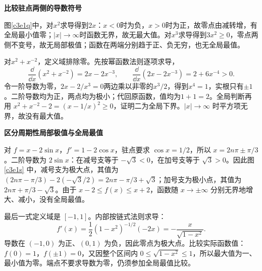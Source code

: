 \begin{solution}\textbf{比较驻点两侧的导数符号}\par\nobreak
图\ref{c3e1q}中，对$x^2$求导得到$2x$：$x<0$时为负，$x>0$时为正，故零点由减转增，有全局最小值零；$|x|\to\infty$时函数无界，故无最大值。对$x^3$求导得到$3x^2\ge0$，零点两侧不变号，故无局部极值；函数在两端分别趋于正、负无穷，也无全局最值。

对$x^2+x^{-2}$，定义域排除零。先按幂函数法则逐项求导，
\[
\frac{\dd}{\dd x}(x^2+x^{-2})=2x-2x^{-3},\qquad
\frac{\dd}{\dd x}(2x-2x^{-3})=2+6x^{-4}>0.
\]
令一阶导数为零，$2x-2/x^3=0$两边乘以非零的$x^3/2$，得到$x^4=1$，实根只有$\pm1$。二阶导数均为正，两点均为极小；代回原函数，值均为$1+1=2$。全局判断再用
$x^2+x^{-2}-2=(x-1/x)^2\ge0$，证明二为全局下界。$|x|\to\infty$ 时平方项无界，故没有最大值。



\par\medskip{}\noindent\textbf{区分周期性局部极值与全局最值}\par\nobreak
对 $f=x-2\sin x$，$f'=1-2\cos x$，驻点要求 $\cos x=1/2$，所以 $x=2n\pi\pm\pi/3$。二阶导数为 $2\sin x$：在减号支等于 $-\sqrt3<0$，在加号支等于 $\sqrt3>0$。因此图 \ref{c3e1s} 中，减号支为极大点，其值为
$(2n\pi-\pi/3)-2(-\sqrt3/2)=2n\pi-\pi/3+\sqrt3$；加号支为极小点，其值为 $2n\pi+\pi/3-\sqrt3$。由于 $x-2\le f(x)\le x+2$，函数随 $x\to\pm\infty$ 分别无界地增大、减小，没有全局最值。

最后一式定义域是 $[-1,1]$。内部按链式法则求导：
\[
f'(x)=\frac12(1-x^2)^{-1/2}(-2x)
=-\frac{x}{\sqrt{1-x^2}}.
\]
导数在 $(-1,0)$ 为正、$(0,1)$ 为负，因此零点为极大点。比较实际函数值：$f(0)=1$，$f(\pm1)=0$，又因整个区间内 $0\le\sqrt{1-x^2}\le1$，所以最大值为一、最小值为零。端点不要求导数为零，仍须参加全局最值比较。
\end{solution}

